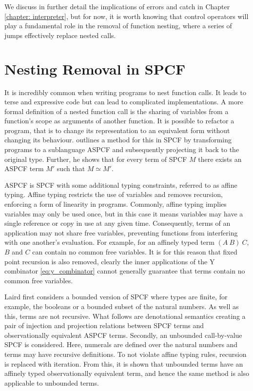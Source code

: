 \documentclass[12pt,a4paper]{report}
\theoremstyle{definition}
\theoremstyle{definition}
\theoremstyle{remark}
\begin{document}
We discuss in further detail the implications of errors and catch in Chapter \ref{chapter: interpreter}, but for now, it is worth knowing that control operators will play a fundamental role in the removal of function nesting, where a series of jumps effectively replace nested calls.

\section{Nesting Removal in SPCF}\label{sec:nesting_removal}
It is incredibly common when writing programs to nest function calls. It leads to terse and expressive code but can lead to complicated implementations. A more formal definition of a nested function call is the sharing of variables from a function's scope as arguments of another function. It is possible to refactor a program, that is to change its representation to an equivalent form without changing its behaviour. \cite{laird_2007} outlines a method for this in SPCF by transforming programs to a sublanguage ASPCF and subsequently projecting it back to the original type. Further, he shows that for every term of SPCF $M$ there exists an ASPCF term $M'$ such that $M \simeq M'$.

ASPCF is SPCF with some additional typing constraints, referred to as affine typing. Affine typing restricts the use of variables and removes recursion, enforcing a form of linearity in programs. Commonly, affine typing implies variables may only be used once, but in this case it means variables may have a single reference or copy in use at any given time. Consequently, terms of an application may not share free variables, preventing functions from interfering with one another's evaluation. For example, for an affinely typed term $(A\ B)\ C$, $B$ and $C$ can contain no common free variables. It is for this reason that fixed point recursion is also removed, clearly the inner applications of the Y combinator \eqref{eq:y_combinator} cannot generally guarantee that terms contain no common free variables.

Laird first considers a bounded version of SPCF where types are finite, for example, the booleans or a bounded subset of the natural numbers. As well as this, terms are not recursive. What follows are denotational semantics creating a pair of injection and projection relations between SPCF terms and observationally equivalent ASPCF terms. Secondly, an unbounded call-by-value SPCF is considered. Here, numerals are defined over the natural numbers and terms may have recursive definitions. To not violate affine typing rules, recursion is replaced with iteration. From this, it is shown that unbounded terms have an affinely typed observationally equivalent term, and hence the same method is also applicable to unbounded terms.
\end{document}
